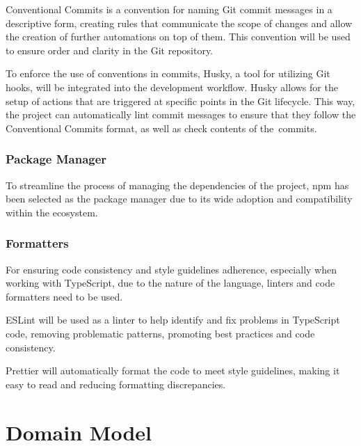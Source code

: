 Conventional Commits is a convention for naming Git commit messages in a descriptive form, creating rules that communicate the scope of changes and allow the creation of further automations on top of them. This convention will be used to ensure order and clarity in the Git repository.~\cite{ConventionalCommits}

To enforce the use of conventions in commits, Husky, a tool for utilizing Git hooks, will be integrated into the development workflow. Husky allows for the setup of actions that are triggered at specific points in the Git lifecycle. This way, the project can automatically lint commit messages to ensure that they follow the Conventional Commits format, as well as check contents of the~commits.~\cite{Husky}

\subsubsection{Package Manager}

To streamline the process of managing the dependencies of the project, npm has been selected as the package manager due to its wide adoption and compatibility within the ecosystem. \cite{Abramowski2022}

\subsubsection{Formatters}

For ensuring code consistency and style guidelines adherence, especially when working with TypeScript, due to the nature of the language, linters and code formatters need to be used.

ESLint will be used as a linter to help identify and fix problems in TypeScript code, removing problematic patterns, promoting best practices and code consistency. \cite{Gupta2021}

Prettier will automatically format the code to meet style guidelines, making it easy to read and reducing formatting discrepancies. \cite{Wojtasinski2023}


\section{Domain Model} \label{section:domain-model}

